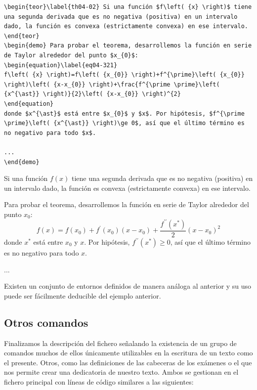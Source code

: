 \begin{lstlisting}[frame=none]
\begin{teor}\label{th04-02} Si una función $f\left( {x} \right)$ tiene una segunda derivada que es no negativa (positiva) en un intervalo dado, la función es convexa (estrictamente convexa) en ese intervalo.
\end{teor}
\begin{demo} Para probar el teorema, desarrollemos la función en serie de Taylor alrededor del punto $x_{0}$:
\begin{equation}\label{eq04-321}
f\left( {x} \right)=f\left( {x_{0}} \right)+f^{\prime}\left( {x_{0}} \right)\left( {x-x_{0}} \right)+\frac{f^{\prime \prime}\left( {x^{\ast}} \right)}{2}\left( {x-x_{0}} \right)^{2}
\end{equation}
donde $x^{\ast}$ está entre $x_{0}$ y $x$. Por hipótesis, $f^{\prime \prime}\left( {x^{\ast}} \right)\ge 0$, así que el último término es no negativo para todo $x$.

...
\end{demo}
\end{lstlisting}

\begin{teor}\label{th04-02} Si una función $f\left( {x} \right)$ tiene una segunda derivada que es no negativa (positiva) en un intervalo dado, la función es convexa (estrictamente convexa) en ese intervalo.
\end{teor}
\begin{demo} Para probar el teorema, desarrollemos la función en serie de Taylor alrededor del punto $x_{0}$:
\begin{equation}\label{eq04-321}
f\left( {x} \right)=f\left( {x_{0}} \right)+f^{\prime}\left( {x_{0}} \right)\left( {x-x_{0}} \right)+\frac{f^{\prime \prime}\left( {x^{\ast}} \right)}{2}\left( {x-x_{0}} \right)^{2}
\end{equation}
donde $x^{\ast}$ está entre $x_{0}$ y $x$. Por hipótesis, $f^{\prime \prime}\left( {x^{\ast}} \right)\ge 0$, así que el último término es no negativo para todo $x$.

...
\end{demo}

Existen un conjunto de entornos definidos de manera análoga al anterior y su uso puede ser fácilmente deducible del ejemplo anterior.

\subsection{Otros comandos}
Finalizamos la descripción del fichero señalando la existencia de un grupo de comandos muchos de ellos únicamente utilizables en la escritura de un texto como el presente. Otros, como las definiciones de las cabeceras de los exámenes o el que nos permite crear una dedicatoria de nuestro texto. Ambos se gestionan en el fichero principal con líneas de código similares a las siguientes:


